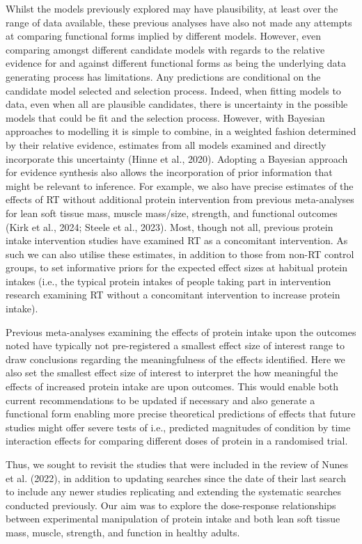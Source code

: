 \documentclass[
]{article}
\begin{document}
Whilst the models previously explored may have plausibility, at least
over the range of data available, these previous analyses have also not
made any attempts at comparing functional forms implied by different
models. However, even comparing amongst different candidate models with
regards to the relative evidence for and against different functional
forms as being the underlying data generating process has limitations.
Any predictions are conditional on the candidate model selected and
selection process. Indeed, when fitting models to data, even when all
are plausible candidates, there is uncertainty in the possible models
that could be fit and the selection process. However, with Bayesian
approaches to modelling it is simple to combine, in a weighted fashion
determined by their relative evidence, estimates from all models
examined and directly incorporate this uncertainty ({Hinne et al.},
2020). Adopting a Bayesian approach for evidence synthesis also allows
the incorporation of prior information that might be relevant to
inference. For example, we also have precise estimates of the effects of
RT without additional protein intervention from previous meta-analyses
for lean soft tissue mass, muscle mass/size, strength, and functional
outcomes (Kirk et al., 2024; Steele et al., 2023). Most, though not all,
previous protein intake intervention studies have examined RT as a
concomitant intervention. As such we can also utilise these estimates,
in addition to those from non-RT control groups, to set informative
priors for the expected effect sizes at habitual protein intakes (i.e.,
the typical protein intakes of people taking part in intervention
research examining RT without a concomitant intervention to increase
protein intake).

Previous meta-analyses examining the effects of protein intake upon the
outcomes noted have typically not pre-registered a smallest effect size
of interest range to draw conclusions regarding the meaningfulness of
the effects identified. Here we also set the smallest effect size of
interest to interpret the how meaningful the effects of increased
protein intake are upon outcomes. This would enable both current
recommendations to be updated if necessary and also generate a
functional form enabling more precise theoretical predictions of effects
that future studies might offer severe tests of i.e., predicted
magnitudes of condition by time interaction effects for comparing
different doses of protein in a randomised trial.

Thus, we sought to revisit the studies that were included in the review
of Nunes et al. (2022), in addition to updating searches since the date
of their last search to include any newer studies replicating and
extending the systematic searches conducted previously. Our aim was to
explore the dose-response relationships between experimental
manipulation of protein intake and both lean soft tissue mass, muscle,
strength, and function in healthy adults.
\end{document}
